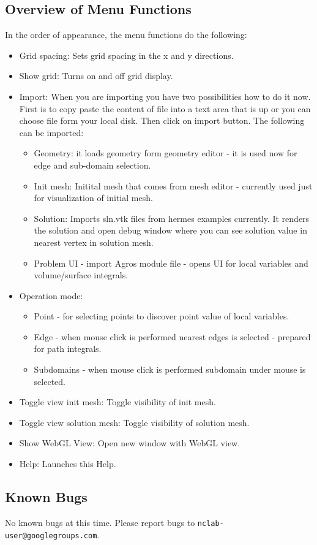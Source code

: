 \documentclass{article}
\begin{document}
\subsection*{Overview of Menu Functions}

In the order of appearance, the menu functions do the following:
\begin{itemize}
\item Grid spacing: Sets grid spacing in the x and y directions.
\item Show grid: Turns on and off grid display.
\item Import: When you are importing you have two possibilities how to do it now. First is to copy paste the content of file into a text area that is up or you can choose file form your local disk. Then click on import button. The following can be imported:
\begin{itemize}
\item Geometry: it loads geometry form geometry editor - it is used now for edge and sub-domain selection.
\item Init mesh: Initital mesh that comes from mesh editor - currently used just for visualization of initial mesh.
\item Solution: Imports sln.vtk files from hermes examples currently. It renders the solution and open debug window where you can see solution value in nearest vertex in solution mesh.
\item Problem UI - import Agros module file - opens UI for local variables and volume/surface integrals.
\end{itemize}
\item Operation mode:
\begin{itemize}
\item Point - for selecting points to discover point value of local variables.
\item Edge - when mouse click is performed nearest edges is selected - prepared for path integrals.
\item Subdomains - when mouse click is performed subdomain under mouse is selected.
\end{itemize}
\item Toggle view init mesh: Toggle visibility of init mesh.
\item Toggle view solution mesh: Toggle visibility of solution mesh.
\item Show WebGL View: Open new window with WebGL view.
\item Help: Launches this Help.
\end{itemize}



\subsection*{Known Bugs}

No known bugs at this time. Please report bugs to {\tt nclab-user@googlegroups.com}.
\end{document}
